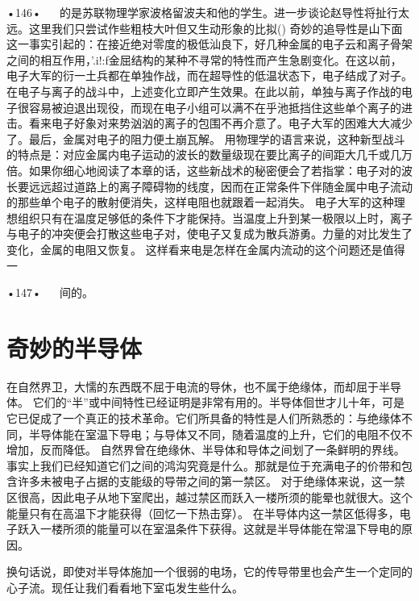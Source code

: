 {•146•
  
的是苏联物理学家波格留波夫和他的学生。进一步谈论赵导性将扯行太远。这里我们只尝试作些粗枝大叶但又生动形象的比拟()
奇妙的追导性是山下面这一事实引起的：在接近绝对零度的极低汕良下，好几种金属的电子云和离子骨架之间的相互作用，'.i!:f金屈结构的某种不寻常的特性而产生急剧变化。在这以前，电子大军的衍一土兵都在单独作战，而在超导性的低温状态下，电子结成了对子。
在电子与离子的战斗中，上述变化立即产生效果。在此以前，单独与离子作战的电子很容易被迫退出现役，而现在电子小组可以满不在乎池抵挡住这些单个离子的进击。看来电子好象对来势汹汹的离子的包围不再介意了。电子大军的困难大大减少了。最后，金属对电子的阻力便土崩瓦解。
用物理学的语言来说，这种新型战斗的特点是：对应金属内电子运动的波长的数量级现在要比离子的间距大几千或几万倍。如果你细心地阅读了本章的话，这些新战术的秘密便会了若指掌：电子对的波长要远远超过道路上的离子障碍物的线度，因而在正常条件下伴随金属中电子流动的那些单个电子的散射便消失，这样电阻也就跟着一起消失。
电子大军的这种理想组织只有在温度足够低的条件下才能保持。当温度上升到某一极限以上时，离子与电子的冲突便会打散这些电子对，使电子又复成为散兵游勇。力量的对比发生了变化，金属的电阻又恢复。
这样看来电是怎样在金属内流动的这个问题还是值得一

•147•
  
间的。


\section{奇妙的半导体}

 
在自然界卫，大懦的东西既不屈于电流的导休，也不属于绝缘体，而却屈于半导体。
它们的“半”或中间特性已经证明是非常有用的。半导体佪世才儿十年，可是它已促成了一个真正的技术革命。它们所具备的特性是人们所熟悉的：与绝缘体不同，半导体能在室温下导电；与导体又不同，随着温度的上升，它们的电阻不仅不增加，反而降低。
自然界曾在绝缘休、半导体和导体之间划了一条鲜明的界线。事实上我们已经知道它们之间的鸿沟究竟是什么。那就是位于充满电子的价带和包含许多未被电子占据的支能级的导带之间的第一禁区。
对于绝缘体来说，这一禁区很高，因此电子从地下室爬出，越过禁区而跃入一楼所须的能晕也就很大。这个能量只有在高温下才能获得（回忆一下热击穿）。
在半导体内这一禁区低得多，电子跃入一楼所须的能量可以在室温条件下获得。这就是半导体能在常温下导电的原因。

换句话说，即使对半导体施加一个很弱的电场，它的传导带里也会产生一个定同的心子流。现任让我们看看地下室屯发生些什么。

}
